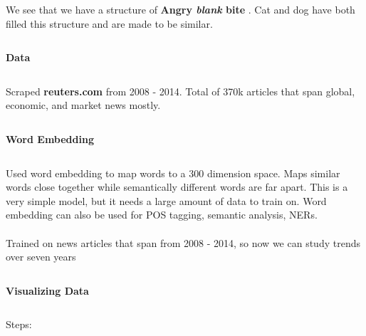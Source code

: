 \documentclass[ruled]{article}
\begin{document}
We see that we have a structure of \textbf {Angry \textit{blank} bite }.  Cat and dog have both filled this structure and are made to be similar.
\\
\noindent\makebox[\linewidth]{\rule{\paperwidth}{0.4pt}}
\begin{verbatim}

\end{verbatim}
\begin{center}
{\Large \textbf{Data} }
\end{center}
\begin{verbatim}

\end{verbatim}
Scraped \textbf{reuters.com} from 2008 - 2014.  Total of 370k articles that span global, economic, and market news mostly.
\\
\noindent\makebox[\linewidth]{\rule{\paperwidth}{0.4pt}}
\begin{verbatim}

\end{verbatim}
\begin{center}
{\Large \textbf{Word Embedding} }
\end{center}
\begin{verbatim}

\end{verbatim}
Used word embedding to map words to a 300 dimension space. Maps similar words close together while semantically different words are far apart.  This is a very simple model, but it needs a large amount of data to train on.  Word embedding can also be used for POS tagging, semantic analysis, NERs.
\\\\ 
Trained on news articles that span from 2008 - 2014, so now we can study trends over seven years
\\
\noindent\makebox[\linewidth]{\rule{\paperwidth}{0.4pt}}
\begin{verbatim}

\end{verbatim}
\begin{center}
{\Large \textbf{Visualizing Data} }
\end{center}
\begin{verbatim}

\end{verbatim}
Steps: \\
\end{document}
